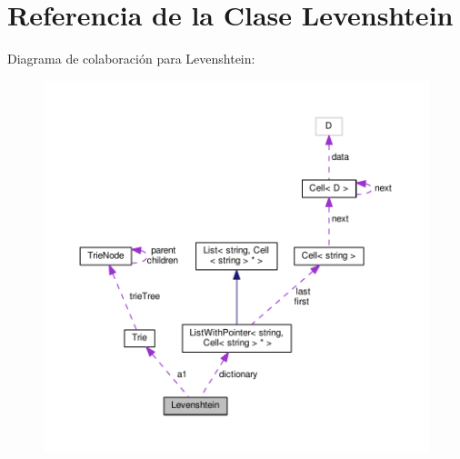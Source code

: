 \hypertarget{class_levenshtein}{\section{Referencia de la Clase Levenshtein}
\label{class_levenshtein}
}


Diagrama de colaboración para Levenshtein\-:\nopagebreak
\begin{figure}[H]
\begin{center}
\leavevmode
\includegraphics[width=350pt]{class_levenshtein__coll__graph}
\end{center}
\end{figure}
